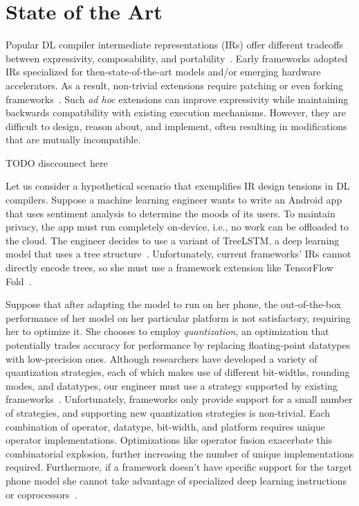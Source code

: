 \section{State of the Art}

Popular DL compiler intermediate representations (IRs) offer different tradeoffs
  between expressivity, composability, and portability~\citep{
    tensorflow, pytorch_ad, chainer_learningsys2015, tangent, theano, glow}.
Early frameworks adopted IRs
  specialized for then-state-of-the-art models and/or
  emerging hardware accelerators.
As a result, non-trivial extensions require
  patching or even forking frameworks~\citep{
    tf_fold, tf_lite, tangent, tf_eager, xla, glow, torchscript}.
Such \textit{ad hoc} extensions can improve expressivity
  while maintaining backwards compatibility with existing execution mechanisms.
However, they are difficult to design, reason about, and implement,
  often resulting in modifications that are mutually incompatible.

TODO discconnect here

Let us consider a hypothetical scenario that exemplifies
  IR design tensions in DL compilers.
Suppose a machine learning engineer wants to write
  an Android app that uses sentiment analysis to
  determine the moods of its users.
To maintain privacy, the app must run completely on-device,
  i.e., no work can be offloaded to the cloud.
The engineer decides to use a variant of TreeLSTM,
  a deep learning model that uses a tree structure~\citep{tree_lstm}.
Unfortunately, current frameworks' IRs cannot directly encode trees,
  so she must use a framework extension
  like TensorFlow Fold~\citep{tensorflowfold}.

Suppose that after adapting the model to run on her phone,
  the out-of-the-box performance of her
  model on her particular platform is not satisfactory, requiring her to optimize it.
She chooses to employ \textit{quantization}, an optimization that
  potentially trades accuracy for performance by replacing
  floating-point datatypes with low-precision ones.
Although researchers have developed a variety of quantization
  strategies, each of which makes use of different bit-widths, rounding
  modes, and datatypes, our engineer must use a strategy supported
  by existing frameworks~\citep{gustafson2015end, tf_lite_ops_compat, glow_quant}.
Unfortunately, frameworks only provide support for a small number
  of strategies, and supporting new quantization strategies is non-trivial.
Each combination of operator, datatype, bit-width, and
  platform requires unique operator implementations.
Optimizations like operator fusion exacerbate this combinatorial explosion,
  further increasing the number of unique implementations required.
Furthermore, if a framework doesn't have specific support for
  the target phone model she cannot take advantage of specialized deep learning
  instructions or coprocessors~\citep{apple_neural_engine}.

